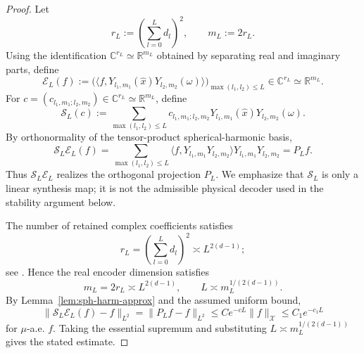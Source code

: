\documentclass{article}
\numberwithin{equation}{section}
\theoremstyle{plain}
\begin{document}
	\begin{proof}
		Let
		\begin{equation*}
		r_L
		:=
		\left(\sum_{l=0}^{L}d_l\right)^2,
		\qquad
		m_L:=2r_L.
		\end{equation*}
		Using the identification $\mathbb C^{r_L}\simeq\mathbb R^{m_L}$
		obtained by separating real and imaginary parts, define
		\begin{equation*}
		\mathcal E_L(f)
		:=
		\bigl(
		\langle f,Y_{l_1,m_1}(\hat x)Y_{l_2,m_2}(\omega)\rangle
		\bigr)_{\max(l_1,l_2)\le L}
		\in\mathbb C^{r_L}\simeq\mathbb R^{m_L}.
		\end{equation*}
		For
		$c=(c_{l_1,m_1;l_2,m_2})
		\in\mathbb C^{r_L}\simeq\mathbb R^{m_L}$, define
		\begin{equation*}
		\mathcal S_L(c)
		:=
		\sum_{\max(l_1,l_2)\le L}
		c_{l_1,m_1;l_2,m_2}
		Y_{l_1,m_1}(\hat x)Y_{l_2,m_2}(\omega).
		\end{equation*}
		By orthonormality of the tensor-product spherical-harmonic basis,
		\begin{equation*}
		\mathcal S_L\mathcal E_L(f)
		=
		\sum_{\max(l_1,l_2)\le L}
		\langle f,Y_{l_1,m_1}Y_{l_2,m_2}\rangle
		Y_{l_1,m_1}Y_{l_2,m_2}
		=P_Lf.
		\end{equation*}
		Thus $\mathcal S_L\mathcal E_L$ realizes the orthogonal projection $P_L$. We emphasize that $\mathcal S_L$ is only a linear synthesis map; it is not the admissible physical decoder used in the stability argument below.

		The number of retained complex coefficients satisfies
		\begin{equation*}
		r_L
		=
		\left(\sum_{l=0}^{L}d_l\right)^2
		\asymp L^{2(d-1)};
		\end{equation*}
		see \cite{DX13}. Hence the real encoder dimension satisfies
		\begin{equation*}
		m_L=2r_L\asymp L^{2(d-1)},
		\qquad
		L\asymp m_L^{1/(2(d-1))}.
		\end{equation*}
		By Lemma~\ref{lem:sph-harm-approx} and the assumed uniform bound,
		\begin{equation*}
		\|\mathcal S_L\mathcal E_L(f)-f\|_{L^2}
		=\|P_Lf-f\|_{L^2}
		\le Ce^{-cL}\|f\|_{\mathcal X}
		\le C_1e^{-c_1L}
		\end{equation*}
		for $\mu$-a.e. $f$. Taking the essential supremum and substituting $L\asymp m_L^{1/(2(d-1))}$ gives the stated estimate.
	\end{proof}
	
\end{document}
